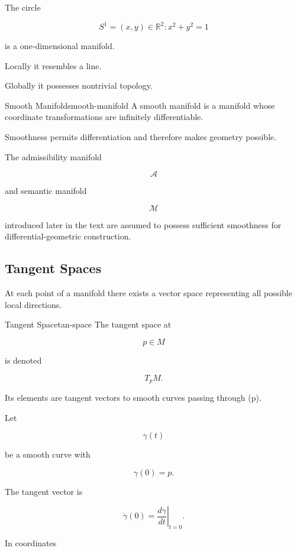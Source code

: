 \documentclass[12pt,twoside,openright]{book}
\newenvironment{ex}
{\begin{example}{}{}}
{\end{example}}
\begin{document}
\begin{ex}
The circle

\[
S^1
=

{(x,y)\in\mathbb R^2:x^2+y^2=1}
\]

is a one-dimensional manifold.

Locally it resembles a line.

Globally it possesses nontrivial topology.
\end{ex}

\begin{definition}{Smooth Manifold}{smooth-manifold}
A smooth manifold is a manifold whose coordinate
transformations are infinitely differentiable.
\end{definition}

Smoothness permits differentiation and therefore makes
geometry possible.

The admissibility manifold

\[
\mathcal A
\]

and semantic manifold

\[
\mathcal M
\]

introduced later in the text are assumed to possess
sufficient smoothness for differential-geometric
construction.

\subsection{Tangent Spaces}

At each point of a manifold there exists a vector space
representing all possible local directions.

\begin{definition}{Tangent Space}{tan-space}
The tangent space at

\[
p\in M
\]

is denoted

\[
T_pM.
\]

Its elements are tangent vectors to smooth curves passing
through (p).
\end{definition}

Let

\[
\gamma(t)
\]

be a smooth curve with

\[
\gamma(0)=p.
\]

The tangent vector is

\[
\dot\gamma(0)
=

\left.
\frac{d\gamma}{dt}
\right|_{t=0}.
\]

In coordinates
\end{document}
